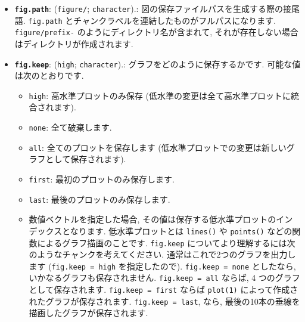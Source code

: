 \documentclass[
  11pt,
  lualatex,
  ja=standard]{bxjsreport}
\providecommand{\tightlist}{%
  \setlength{\itemsep}{0pt}\setlength{\parskip}{0pt}}
\begin{document}
\begin{itemize}
\tightlist
\item
  \textbf{\texttt{fig.path}}: (\texttt{\textquotesingle{}figure/\textquotesingle{}}; \texttt{character}).: 図の保存ファイルパスを生成する際の接尾語. \texttt{fig.path} とチャンクラベルを連結したものがフルパスになります. \texttt{figure/prefix-} のようにディレクトリ名が含まれて, それが存在しない場合はディレクトリが作成されます.
\item
  \textbf{\texttt{fig.keep}}: (\texttt{\textquotesingle{}high\textquotesingle{}}; \texttt{character}).: グラフをどのように保存するかです. 可能な値は次のとおりです.

  \begin{itemize}
  \tightlist
  \item
    \texttt{high}: 高水準プロットのみ保存 (低水準の変更は全て高水準プロットに統合されます).
  \item
    \texttt{none}: 全て破棄します.
  \item
    \texttt{all}: 全てのプロットを保存します (低水準プロットでの変更は新しいグラフとして保存されます).
  \item
    \texttt{first}: 最初のプロットのみ保存します.
  \item
    \texttt{last}: 最後のプロットのみ保存します.
  \item
    数値ベクトルを指定した場合, その値は保存する低水準プロットのインデックスとなります. 低水準プロットとは \texttt{lines()} や \texttt{points()} などの関数によるグラフ描画のことです. \texttt{fig.keep} についてより理解するには次のようなチャンクを考えてください. 通常はこれで2つのグラフを出力します (\texttt{fig.keep = \textquotesingle{}high\textquotesingle{}} を指定したので). \texttt{fig.keep = \textquotesingle{}none\textquotesingle{}} としたなら, いかなるグラフも保存されません. \texttt{fig.keep = \textquotesingle{}all\textquotesingle{}} ならば, 4 つのグラフとして保存されます. \texttt{fig.keep = \textquotesingle{}first\textquotesingle{}} ならば \texttt{plot(1)} によって作成されたグラフが保存されます. \texttt{fig.keep = \textquotesingle{}last\textquotesingle{}}, なら, 最後の10本の垂線を描画したグラフが保存されます.
  \end{itemize}


\end{itemize}
\end{document}
